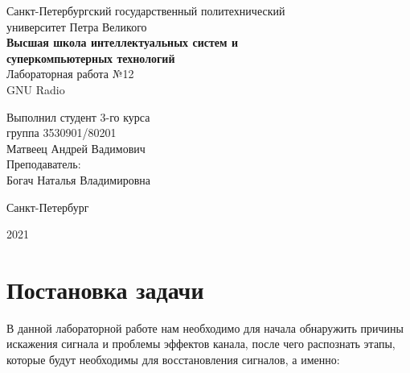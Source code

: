 \documentclass[a4paper]{article}
\begin{document}
    \begin{center}
        \begin{center}
        \hfill \break
        \normalsize{Санкт-Петербургский государственный политехнический}\\
        \normalsize{университет Петра Великого}\\
        \hfill \break
        \normalsize{\textbf{Высшая школа интеллектуальных систем и}}\\ 
        \normalsize{\textbf{суперкомпьютерных технологий}}\\ 
        \hfill \break
        \hfill \break
        \hfill \break
        \normalsize{Лабораторная работа №12}\\
        \hfill \break
        \hfill \break
        \normalsize{\LARGE GNU Radio}\\
        \end{center}
        \hfill \break
        \hfill \break
        \hfill \break
        \hfill \break
        \hfill \break
        \hfill \break
        \hfill \break
        \hfill \break
        \hfill \break
        \hfill \break
        \begin{flushright}
            \normalsize{Выполнил студент 3-го курса}\\
            \normalsize{группа 3530901/80201}\\
            \normalsize{Матвеец Андрей Вадимович}\\
            \hfill \break
            \normalsize{Преподаватель:}\\
            \normalsize{Богач Наталья Владимировна}\\
        \end{flushright}
        \hfill \break
        \hfill \break
        \hfill \break
        \hfill \break
        \begin{center} Санкт-Петербург\end{center}
        \begin{center}2021\end{center} 
        \thispagestyle{empty}
    \end{center}
    
    \newpage
        \tableofcontents
    
    \newpage
         \listoffigures 
         
    \newpage
        \section{Постановка задачи}
            В данной лабораторной работе нам необходимо для начала обнаружить причины искажения сигнала и проблемы эффектов канала, после чего распознать этапы, которые будут необходимы для восстановления сигналов, а именно:
            
\end{document}

